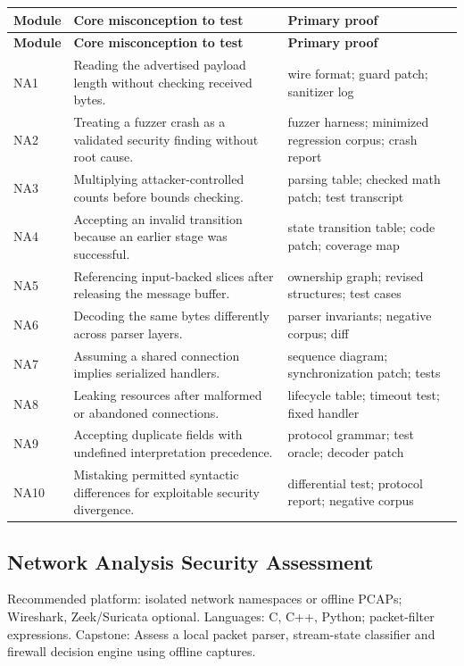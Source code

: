 \documentclass[10pt,letterpaper]{article}
\begin{document}
\begingroup\footnotesize\setlength\tabcolsep{3pt}
\begin{longtable}{>{\raggedright\arraybackslash}p{}>{\raggedright\arraybackslash}p{}>{\raggedright\arraybackslash}p{}}\toprule
\textbf{Module} & \textbf{Core misconception to test} & \textbf{Primary proof}\\\midrule\endfirsthead
\toprule \textbf{Module} & \textbf{Core misconception to test} & \textbf{Primary proof}\\\midrule\endhead
NA1 & Reading the advertised payload length without checking received bytes. & wire format; guard patch; sanitizer log\\\midrule
NA2 & Treating a fuzzer crash as a validated security finding without root cause. & fuzzer harness; minimized regression corpus; crash report\\\midrule
NA3 & Multiplying attacker-controlled counts before bounds checking. & parsing table; checked math patch; test transcript\\\midrule
NA4 & Accepting an invalid transition because an earlier stage was successful. & state transition table; code patch; coverage map\\\midrule
NA5 & Referencing input-backed slices after releasing the message buffer. & ownership graph; revised structures; test cases\\\midrule
NA6 & Decoding the same bytes differently across parser layers. & parser invariants; negative corpus; diff\\\midrule
NA7 & Assuming a shared connection implies serialized handlers. & sequence diagram; synchronization patch; tests\\\midrule
NA8 & Leaking resources after malformed or abandoned connections. & lifecycle table; timeout test; fixed handler\\\midrule
NA9 & Accepting duplicate fields with undefined interpretation precedence. & protocol grammar; test oracle; decoder patch\\\midrule
NA10 & Mistaking permitted syntactic differences for exploitable security divergence. & differential test; protocol report; negative corpus\\\midrule
\bottomrule\end{longtable}\endgroup
\subsection{Network Analysis Security Assessment}
Recommended platform: isolated network namespaces or offline PCAPs; Wireshark, Zeek/Suricata optional. Languages: C, C++, Python; packet-filter expressions. Capstone: Assess a local packet parser, stream-state classifier and firewall decision engine using offline captures.
\end{document}
